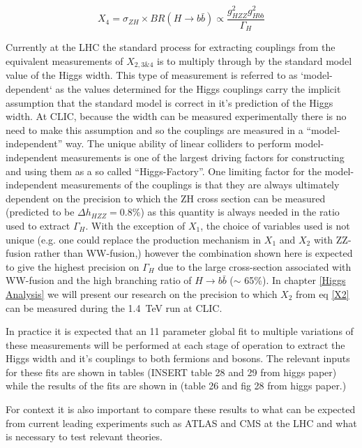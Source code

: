 \begin{equation}
X_4=\sigma_{ZH} \times BR(H\rightarrow b\bar{b}) \propto \frac{g_{HZZ}^{2}g_{Hbb}^2}{\Gamma_H}
\end{equation}


Currently at the LHC the standard process for extracting couplings from the equivalent measurements of $X_{2,3\&4}$ is to multiply through by the standard model value of the Higgs width. This type of measurement is referred to as `model-dependent` as the values determined for the Higgs couplings carry the implicit assumption that the standard model is correct in it's prediction of the Higgs width. At CLIC, because the width can be measured experimentally there is no need to make this assumption and so the couplings are measured in a ``model-independent'' way. The unique ability of linear colliders to perform model-independent measurements is one of the largest driving factors for constructing and using them as a so called ``Higgs-Factory''. One limiting factor for the model-independent measurements of the couplings is that they are always ultimately dependent on the precision to which the ZH cross section can be measured (predicted to be $\Delta h_{HZZ} = 0.8\%$) as this quantity is always needed in the ratio used to extract $\Gamma_H$. With the exception of $X_1$, the choice of variables used is not unique (e.g. one could replace the production mechanism in $X_1$ and $X_2$ with ZZ-fusion rather than WW-fusion,) however the combination shown here is expected to give the highest precision on $\Gamma_H$ due to the large cross-section associated with WW-fusion and the high branching ratio of $H\rightarrow b\bar{b}$ ($\sim$ 65\%). In chapter \ref{Higgs Analysis} we will present our research on the precision to which $X_2$ from eq \ref{X2} can be measured during the 1.4~TeV run at CLIC.

In practice it is expected that an 11 parameter global fit to multiple variations of these measurements will be performed at each stage of operation to extract the Higgs width and it's couplings to both fermions and bosons. The relevant inputs for these fits are shown in tables (INSERT table 28 and 29 from higgs paper) while the results of the fits are shown in (table 26 and fig 28 from higgs paper.)



For context it is also important to compare these results to what can be expected from current leading experiments such as ATLAS and CMS at the LHC and what is necessary to test relevant theories.

